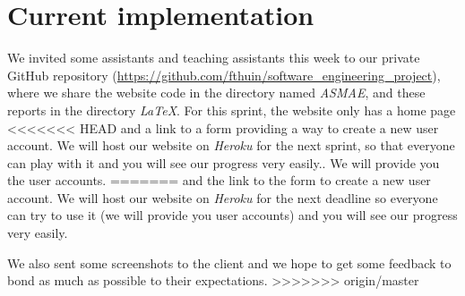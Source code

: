 
\section{Current implementation}

We invited some assistants and teaching assistants this week to our private GitHub repository
(\url{https://github.com/fthuin/software_engineering_project}), where we
share the website code in the directory named \textit{ASMAE}, and these reports in the
directory \textit{LaTeX}. For this sprint, the website only has a home page
<<<<<<< HEAD
and a link to a form providing a way to create a new user account. We will host
our website on \textit{Heroku} for the next sprint, so that everyone can play with it
and you will see our progress very easily.. We will provide you the user accounts.
=======
and the link to the form to create a new user account. We will host
our website on \textit{Heroku} for the next deadline so everyone can try to
use it (we will provide you user accounts) and you will see our progress
very easily. \newline

We also sent some screenshots to the client and we hope to get some
feedback to bond as much as possible to their expectations. \newline
>>>>>>> origin/master
